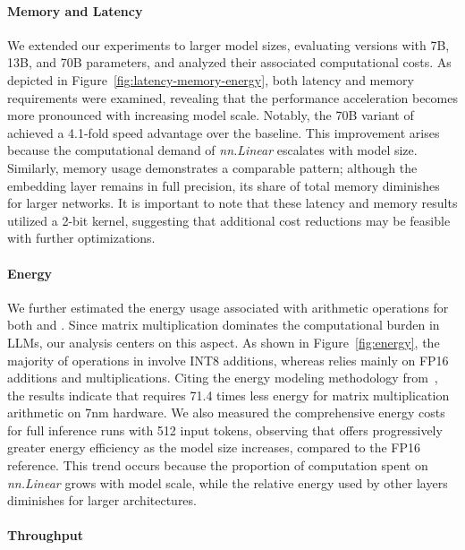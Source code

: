 \paragraph{Memory and Latency}

We extended our experiments to larger model sizes, evaluating versions with 7B, 13B, and 70B parameters, and analyzed their associated computational costs. As depicted in Figure~\ref{fig:latency-memory-energy}, both latency and memory requirements were examined, revealing that the performance acceleration becomes more pronounced with increasing model scale. Notably, the 70B variant of  achieved a 4.1-fold speed advantage over the  baseline. This improvement arises because the computational demand of \emph{nn.Linear} escalates with model size. Similarly, memory usage demonstrates a comparable pattern; although the embedding layer remains in full precision, its share of total memory diminishes for larger networks. It is important to note that these latency and memory results utilized a 2-bit kernel, suggesting that additional cost reductions may be feasible with further optimizations.

\paragraph{Energy}

We further estimated the energy usage associated with arithmetic operations for both  and . Since matrix multiplication dominates the computational burden in LLMs, our analysis centers on this aspect. As shown in Figure~\ref{fig:energy}, the majority of operations in  involve INT8 additions, whereas  relies mainly on FP16 additions and multiplications. Citing the energy modeling methodology from~\cite{energycost, pokebnn}, the results indicate that  requires 71.4 times less energy for matrix multiplication arithmetic on 7nm hardware. We also measured the comprehensive energy costs for full inference runs with 512 input tokens, observing that  offers progressively greater energy efficiency as the model size increases, compared to the FP16  reference. This trend occurs because the proportion of computation spent on \emph{nn.Linear} grows with model scale, while the relative energy used by other layers diminishes for larger architectures.

\paragraph{Throughput}

